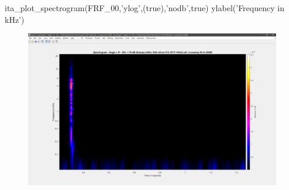 \documentclass[12pt, a4paper, twoside, onecolumn]{article}%
\begin{document}
\pagebreak
\begin{matlabbox}
ita_plot_spectrogram(FRF_00,'ylog',(true),'nodb',true)
ylabel('Frequency in kHz')
\end{matlabbox}
\begin{figure}[H] \centering
\includegraphics[width=.7\textwidth]{Figures/E11.jpg}
\end{figure}
\end{document}
